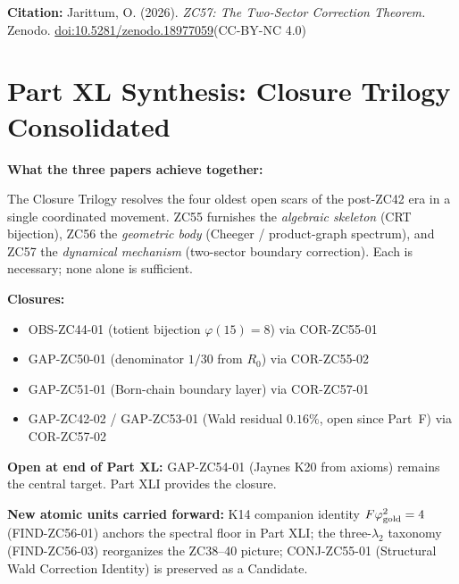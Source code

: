 \documentclass[12pt, a4paper]{article}
\begin{document}
\bigskip
\begin{center}
\textbf{Citation:} Jarittum, O. (2026).
\textit{ZC57: The Two-Sector Correction Theorem.}
Zenodo.
\href{https://doi.org/10.5281/zenodo.18977059}%
{doi:10.5281/zenodo.18977059}\quad (CC-BY-NC 4.0)
\end{center}


\section{Part XL Synthesis: Closure Trilogy Consolidated}
\label{sec:xl-synthesis}

\begin{keybox}[title={Part XL Synthesis --- The Closure Trilogy}]
\textbf{What the three papers achieve together:}

\smallskip
The Closure Trilogy resolves the four oldest open scars of the
post-ZC42 era in a single coordinated movement. ZC55 furnishes the
\emph{algebraic skeleton} (CRT bijection), ZC56 the
\emph{geometric body} (Cheeger / product-graph spectrum), and ZC57 the
\emph{dynamical mechanism} (two-sector boundary correction). Each is
necessary; none alone is sufficient.

\smallskip
\textbf{Closures:}
\begin{itemize}[leftmargin=1.5em]
\item OBS-ZC44-01 (totient bijection $\varphi(15)=8$) \closedcheck{}
  via COR-ZC55-01
\item GAP-ZC50-01 (denominator $1/30$ from $R_0$) \closedcheck{}
  via COR-ZC55-02
\item GAP-ZC51-01 (Born-chain boundary layer) \closedcheck{}
  via COR-ZC57-01
\item GAP-ZC42-02 / GAP-ZC53-01 (Wald residual $0.16\%$, open since
  Part~F) \closedcheck{} via COR-ZC57-02
\end{itemize}

\smallskip
\textbf{Open at end of Part XL:} GAP-ZC54-01 (Jaynes K20 from axioms)
remains the central target. Part XLI provides the closure.

\smallskip
\textbf{New atomic units carried forward:} K14 companion identity
$F\varphi_{\rm gold}^{2}=4$ (FIND-ZC56-01) anchors the spectral floor
in Part XLI; the three-$\lambda_{2}$ taxonomy (FIND-ZC56-03) reorganizes
the ZC38--40 picture; CONJ-ZC55-01 (Structural Wald Correction Identity)
is preserved as a Candidate.
\end{keybox}
\end{document}
